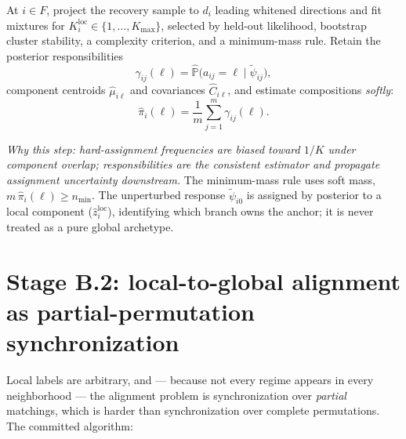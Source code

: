 \documentclass[11pt]{article}
\newcommand{\Prob}{\mathbb{P}}
\newcommand{\why}[1]{\par\noindent\textcolor{muted}{\small\itshape Why this step: #1}}
\begin{document}
At \(i\in F\), project the recovery sample to \(d_i\) leading whitened directions and fit
mixtures for \(K_i^{\mathrm{loc}}\in\{1,\ldots,K_{\max}\}\), selected by held-out likelihood,
bootstrap cluster stability, a complexity criterion, and a minimum-mass rule. Retain the
posterior responsibilities
\[
  \gamma_{ij}(\ell)
  =\widehat{\Prob}\bigl(a_{ij}=\ell\mid\tilde\psi_{ij}\bigr),
\]
component centroids \(\widehat\mu_{i\ell}\) and covariances \(\widehat C_{i\ell}\), and
estimate compositions \emph{softly}:
\[
  \widehat\pi_i(\ell)=\frac{1}{m}\sum_{j=1}^m\gamma_{ij}(\ell).
\]
\why{hard-assignment frequencies are biased toward \(1/K\) under component overlap;
responsibilities are the consistent estimator and propagate assignment uncertainty
downstream.}
The minimum-mass rule uses soft mass, \(m\,\widehat\pi_i(\ell)\ge n_{\min}\). The unperturbed
response \(\tilde\psi_{i0}\) is assigned by posterior to a local component
(\(\widehat z_i^{\mathrm{loc}}\)), identifying which branch owns the anchor; it is never
treated as a pure global archetype.

\section{Stage B.2: local-to-global alignment as partial-permutation synchronization}
\label{sec:sync}

Local labels are arbitrary, and --- because not every regime appears in every neighborhood ---
the alignment problem is synchronization over \emph{partial} matchings, which is harder than
synchronization over complete permutations. The committed algorithm:
\end{document}
